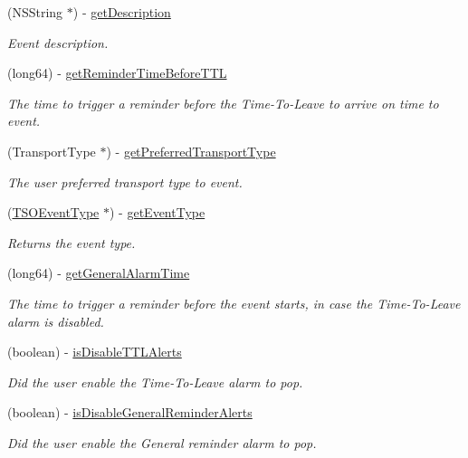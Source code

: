 \begin{DoxyCompactItemize}
(N\+S\+String $\ast$) -\/ \hyperlink{interface_base_event_ad359d955f9853f5c5c50d0df359be50c}{get\+Description}
\begin{DoxyCompactList}\small\item\em Event description. \end{DoxyCompactList}\item 
(long64) -\/ \hyperlink{interface_base_event_a3abff8c812935b4bf65947ab07ab5b16}{get\+Reminder\+Time\+Before\+T\+T\+L}
\begin{DoxyCompactList}\small\item\em The time to trigger a reminder before the Time-\/\+To-\/\+Leave to arrive on time to event. \end{DoxyCompactList}\item 
(Transport\+Type $\ast$) -\/ \hyperlink{interface_base_event_ae5f6adb1975e6d8189cd8effab3ad02c}{get\+Preferred\+Transport\+Type}
\begin{DoxyCompactList}\small\item\em The user preferred transport type to event. \end{DoxyCompactList}\item 
(\hyperlink{interface_t_s_o_event_type}{T\+S\+O\+Event\+Type} $\ast$) -\/ \hyperlink{interface_base_event_a563e7f6ddb1b3543ebc3bdbade7678d2}{get\+Event\+Type}
\begin{DoxyCompactList}\small\item\em Returns the event type. \end{DoxyCompactList}\item 
(long64) -\/ \hyperlink{interface_base_event_a8ab6e634d8844b571978cfb762716595}{get\+General\+Alarm\+Time}
\begin{DoxyCompactList}\small\item\em The time to trigger a reminder before the event starts, in case the Time-\/\+To-\/\+Leave alarm is disabled. \end{DoxyCompactList}\item 
(boolean) -\/ \hyperlink{interface_base_event_a2a96376d69fdd82d780343cff7ee8193}{is\+Disable\+T\+T\+L\+Alerts}
\begin{DoxyCompactList}\small\item\em Did the user enable the Time-\/\+To-\/\+Leave alarm to pop. \end{DoxyCompactList}\item 
(boolean) -\/ \hyperlink{interface_base_event_a30cf54095aa91c34c77f4e39c845ff53}{is\+Disable\+General\+Reminder\+Alerts}
\begin{DoxyCompactList}\small\item\em Did the user enable the General reminder alarm to pop. \end{DoxyCompactList}\item 

\end{DoxyCompactItemize}
